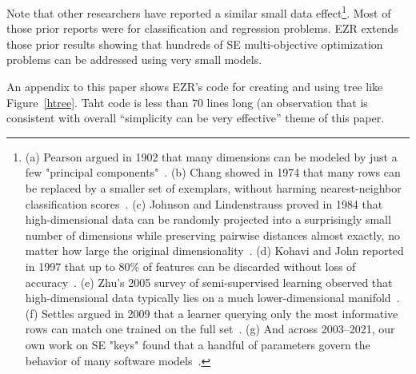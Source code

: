 \documentclass[AMA,STIX2COL]{WileyNJDv5}
\begin{document}
Note that other researchers have reported a similar small data effect\footnote{(a) Pearson argued in 1902 that many dimensions can be modeled by just a few "principal components"~\cite{pca}. (b) Chang showed in 1974 that many rows can be replaced by a smaller set of exemplars, without harming nearest-neighbor classification scores~\cite{chang74}. (c) Johnson and Lindenstrauss proved in 1984 that high-dimensional data can be randomly projected into a surprisingly small number of dimensions while preserving pairwise distances almost exactly, no matter how large the original dimensionality~\cite{johnson1984extensions}. (d) Kohavi and John reported in 1997 that up to 80\% of features can be discarded without loss of accuracy~\cite{kohavi97}. (e) Zhu's 2005 survey of semi-supervised learning observed that high-dimensional data typically lies on a much lower-dimensional manifold~\cite{zhu2005semi}. (f) Settles argued in 2009 that a learner querying only the most informative rows can match one trained on the full set~\cite{settles2009active}. (g) And across 2003--2021, our own work on SE "keys" found that a handful of parameters govern the behavior of many software models~\cite{me03a,me07a,me21a,menzies2008implications}.}.
Most of those prior reports were for classification and regression problems.  EZR extends those prior results showing that hundreds of SE multi-objective optimization
problems can be addressed using very small models.

An appendix to this paper shows EZR's  code for creating and using tree like Figure~\ref{htree}.
Taht code is less than 70 lines long (an observation
that is  consistent with overall ``simplicity can be  very effective'' theme
of this paper.



 
 
 
\end{document}
